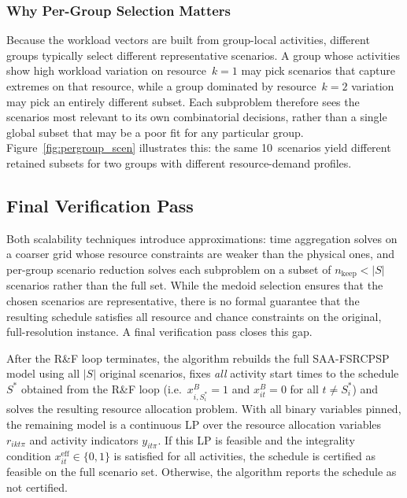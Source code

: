 \subsubsection*{Why Per-Group Selection Matters}

Because the workload vectors are built from group-local
activities, different groups typically select different
representative scenarios. A group whose activities show high
workload variation on resource~$k = 1$ may pick scenarios that
capture extremes on that resource, while a group dominated by
resource~$k = 2$ variation may pick an entirely different subset.
Each subproblem therefore sees the scenarios most relevant to its
own combinatorial decisions, rather than a single global subset
that may be a poor fit for any particular group.
Figure~\ref{fig:pergroup_scen} illustrates this: the same
10~scenarios yield different retained subsets for two groups
with different resource-demand profiles.



\subsection{Final Verification Pass}
\label{subsec:final_verify}

Both scalability techniques introduce approximations: time
aggregation solves on a coarser grid whose resource constraints
are weaker than the physical ones, and per-group scenario
reduction solves each subproblem on a subset of
$n_{\mathrm{keep}} < |S|$ scenarios rather than the full set.
While the medoid selection ensures that the chosen scenarios are
representative, there is no formal guarantee that the resulting
schedule satisfies all resource and chance constraints on the
original, full-resolution instance. A final verification pass
closes this gap.

After the R\&F loop terminates, the algorithm rebuilds the full
SAA-FSRCPSP model using all $|S|$ original scenarios, fixes
\emph{all} activity start times to the schedule $S^*$ obtained
from the R\&F loop (i.e.\ $x^B_{i, S^*_i} = 1$ and
$x^B_{it} = 0$ for all $t \neq S^*_i$) and solves the resulting
resource allocation problem. With all binary variables pinned,
the remaining model is a continuous LP over the resource
allocation variables $r_{ikt\pi}$ and activity indicators
$y_{it\pi}$. If this LP is feasible and the integrality condition
$x^{\mathrm{eff}}_{it} \in \{0, 1\}$ is satisfied for all
activities, the schedule is certified as feasible on the full
scenario set. Otherwise, the algorithm reports the schedule as
not certified.

